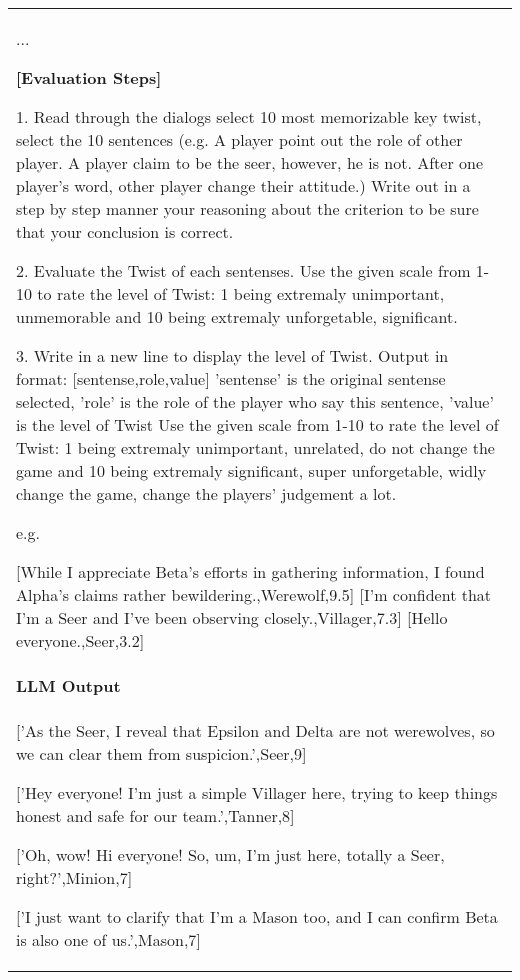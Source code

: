 \begin{table*}[ht]
{\begin{tabular}{p{16cm}}
{    ...

    \textbf{[Evaluation Steps]}

    1. Read through the dialogs select 10 most memorizable key twist, select the 10 sentences (e.g. A player point out the role of other player. A player claim to be the seer, however, he is not. After one player's word, other player change their attitude.)  Write out in a step by step manner your reasoning about the criterion to be sure that your conclusion is correct.

    2. Evaluate the Twist of each sentenses. Use the given scale from 1-10 to rate the level of Twist: 1 being extremaly unimportant, unmemorable and 10 being extremaly unforgetable, significant.
    
    3. Write in a new line to display the level of Twist. Output in format: [sentense,role,value]
    'sentense' is the original sentense selected, 'role' is the role of the player who say this sentence, 'value' is the level of Twist 
    Use the given scale from 1-10 to rate the level of Twist: 1 being extremaly unimportant, unrelated, do not change the game and 10 being extremaly significant, super unforgetable, widly change the game, change the players' judgement a lot.
    
    e.g.

    [While I appreciate Beta's efforts in gathering information, I found Alpha's claims rather bewildering.,Werewolf,9.5]
    [I’m confident that I’m a Seer and I've been observing closely.,Villager,7.3]
    [Hello everyone.,Seer,3.2]

    }
    \\ 

    \rowcolor[gray]{0.95} \vspace*{-8pt} {\fontsize{10pt}{12pt}\selectfont \bf LLM Output } \vspace*{2pt} \\

    {\ttfamily\small

    ['As the Seer, I reveal that Epsilon and Delta are not werewolves, so we can clear them from suspicion.',Seer,9]

    ['Hey everyone! I’m just a simple Villager here, trying to keep things honest and safe for our team.',Tanner,8]

    ['Oh, wow! Hi everyone! So, um, I’m just here, totally a Seer, right?',Minion,7]

    ['I just want to clarify that I’m a Mason too, and I can confirm Beta is also one of us.',Mason,7]

}
\end{tabular}}
\end{table*}

